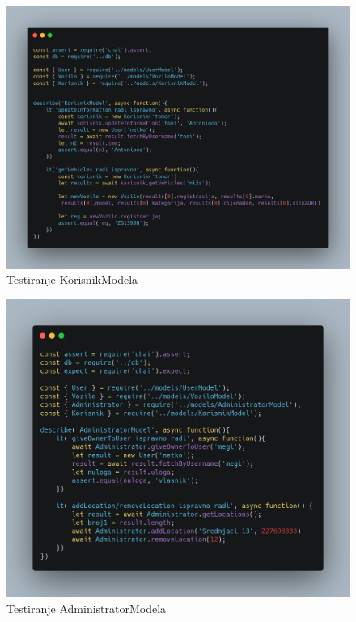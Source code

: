 	
			
			\begin{figure}[hp]
                    \centering
                    \includegraphics[width=15cm]{dokumentacija/slike/KorisnikModel.png}
                    \caption{Testiranje KorisnikModela}
                    \label{fig:useCase-2}
                \end{figure}
			\eject 
			
			\begin{figure}[hp]
                    \centering
                    \includegraphics[width=15cm]{dokumentacija/slike/AdministratorModel.png}
                    \caption{Testiranje AdministratorModela}
                    \label{fig:useCase-2}
                \end{figure}
			\eject 
			
